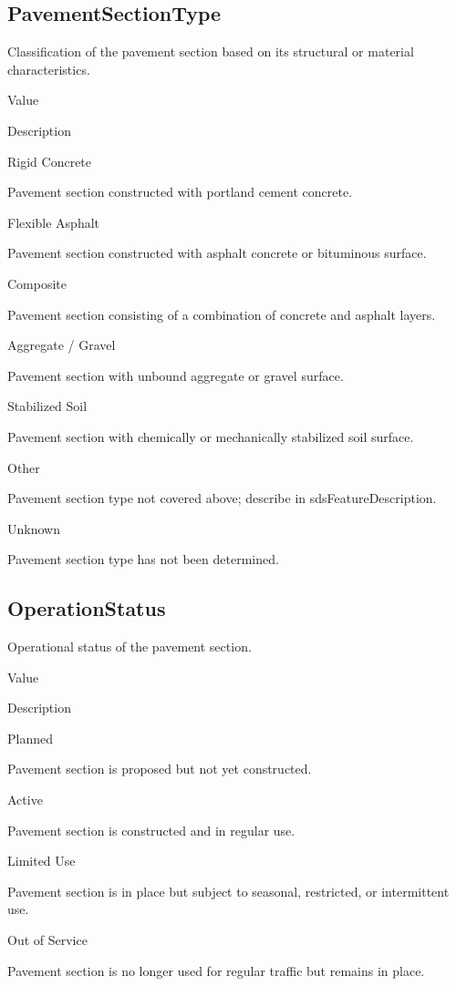 \documentclass[
  letterpaper,
  DIV=11,
  numbers=noendperiod]{scrreprt}
\begin{document}
\subsection{PavementSectionType}\label{pavementsectiontype}

Classification of the pavement section based on its structural or
material characteristics.

Value

Description

Rigid Concrete

Pavement section constructed with portland cement concrete.

Flexible Asphalt

Pavement section constructed with asphalt concrete or bituminous
surface.

Composite

Pavement section consisting of a combination of concrete and asphalt
layers.

Aggregate / Gravel

Pavement section with unbound aggregate or gravel surface.

Stabilized Soil

Pavement section with chemically or mechanically stabilized soil
surface.

Other

Pavement section type not covered above; describe in
sdsFeatureDescription.

Unknown

Pavement section type has not been determined.

\subsection{OperationStatus}\label{operationstatus-2}

Operational status of the pavement section.

Value

Description

Planned

Pavement section is proposed but not yet constructed.

Active

Pavement section is constructed and in regular use.

Limited Use

Pavement section is in place but subject to seasonal, restricted, or
intermittent use.

Out of Service

Pavement section is no longer used for regular traffic but remains in
place.
\end{document}
